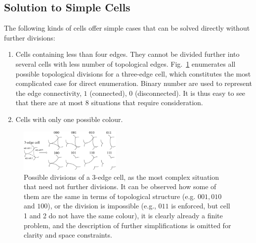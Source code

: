 \documentclass[journal]{IEEEtran}
\begin{document}
\subsection{Solution to Simple Cells}
\label{sec:simple_cell}
The following kinds of cells offer simple cases that can be solved directly without further divisions:
\begin{enumerate}
\item Cells containing less than four edges. They cannot be divided further into several cells with less number of topological edges. Fig.~\ref{figeasycell3} enumerates all possible topological divisions for a three-edge cell, which constitutes the most complicated case for direct enumeration. Binary number are used to represent the edge connectivity, $1$ (connected), $0$ (disconnected). It is thus easy to see that there are at most $8$ situations that require consideration.
\item Cells with only one possible colour.
\end{enumerate}

\begin{figure}[t]
\centering
\includegraphics[width = 0.44\textwidth]{easycell/cell3}
\caption{Possible divisions of a 3-edge cell, as the most complex situation that need not further divisions. It can be observed how some of them are the same in terms of topological structure (e.g. $001, 010$ and $100$), 
or the division is impossible %
(e.g., $011$ is enforced, but cell 1 and 2 do not have the same colour), it is clearly already a finite problem, and the description of   further simplifications is omitted for clarity and space constraints.}
\label{figeasycell3}
\end{figure}
\end{document}
